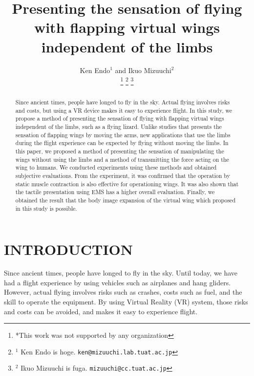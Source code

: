 \documentclass[letterpaper, 10 pt, conference]{ieeeconf}  %
\title{\LARGE \bf
        Presenting the sensation of flying with flapping virtual wings independent of the limbs
}
\author{Ken Endo$^{1}$ and Ikuo Mizuuchi$^{2}$%

        \thanks{*This work was not supported by any organization}%
        \thanks{$^{1}$ Ken Endo is hoge.  
                {\tt\small ken@mizuuchi.lab.tuat.ac.jp}}%
        \thanks{$^{2}$ Ikuo Mizuuchi is fuga.
                {\tt\small mizuuchi@cc.tuat.ac.jp}}%
}
\begin{document}
\maketitle
\thispagestyle{empty}
\pagestyle{empty}


\begin{abstract}
        Since ancient times, people have longed to fly in the sky.  
        Actual flying involves risks and costs, but using a VR device makes it easy to experience flight.  
        In this study, we propose a method of presenting the sensation of flying with flapping virtual wings independent of the limbs, such as a flying lizard.  
        Unlike studies that presents the sensation of flapping wings by moving the arms, new applications that use the limbs during the flight experience can be expected by flying without moving the limbs.  
        In this paper, we proposed a method of presenting the sensation of manipulating the wings without using the limbs and a method of transmitting the force acting on the wing to humans.  
        We conducted experiments using these methods and obtained subjective evaluations.  
        From the experiment, it was confirmed that the operation by static muscle contraction is also effective for operationing wings.  
        It was also shown that the tactile presentation using EMS has a higher overall evaluation.  
        Finally, we obtained the result that the body image expansion of the virtual wing which proposed in this study is possible.
\end{abstract}


\section{INTRODUCTION}


        Since ancient times, people have longed to fly in the sky.  
        Until today, we have had a flight experience by using vehicles such as airplanes and hang gliders.  
        However, actual flying involves risks such as crashes, costs such as fuel, and the skill to operate the equipment.  
        By using Virtual Reality (VR) system, those risks and costs can be avoided, and makes it easy to experience flight.  
\end{document}
